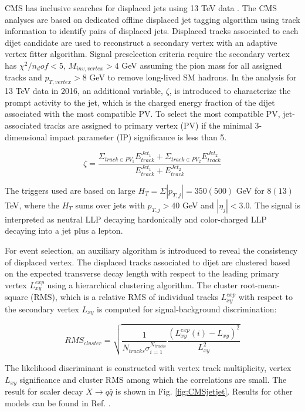 CMS has inclusive searches for displaced jets using 13 TeV data \cite{Sirunyan:2018vlw,Sirunyan:2018pwn}. The CMS analyses are based on dedicated offline displaced jet tagging algorithm using track information to identify pairs of displaced jets. Displaced tracks associated to each dijet candidate are used to reconstruct a secondary vertex with an adaptive vertex fitter algorithm. Signal preselection criteria require the secondary vertex has $\chi^2/n_dof < 5$, $M_{inv,vertex} > 4$ GeV assuming the pion mass for all assigned tracks and $p_{T,vertex} > 8$ GeV to remove long-lived SM hadrons. In the analysis for 13 TeV data in 2016, an additional variable, $\zeta$, is introduced to characterize the prompt activity to the jet, which is the charged energy fraction of the dijet associated with the most compatible PV. To select the most compatible PV, jet-associated tracks are assigned to primary vertex (PV) if the minimal 3-dimensional impact parameter (IP) significance is less than 5. 

\begin{equation}
\zeta = \frac{\Sigma_{track\in PV_1}E^{Jet_1}_{track}+\Sigma_{track\in PV_2}E^{Jet_2}_{track}}{E^{Jet_1}_{track}+E^{Jet_2}_{track}}
\end{equation}

The triggers used are based on large $H_T = \Sigma |p_{T,j}| = 350 (500)$ GeV for $8 (13)$ TeV, where the $H_T$ sums over jets with $p_{T,j} > 40$ GeV and $|\eta_j| <  3.0$. The signal is interpreted as neutral LLP decaying hardonically and color-charged LLP decaying into a jet plus a lepton. 

For event selection, an auxiliary algorithm is introduced to reveal the consistency of displaced vertex. The displaced tracks associated to dijet are clustered based on the expected transverse decay length with respect to the leading primary vertex $L_{xy}^{exp}$ using a hierarchical clustering algorithm. The cluster root-mean-square (RMS), which is a relative RMS of individual tracks $L_{xy}^{exp}$ with respect to the secondary vertex $L_{xy} $ is computed for signal-background discrimination:

\begin{equation}
    RMS_{cluster} = \sqrt{\frac{1}{N_{tracks}\sigma^{N_{tracks}}_{i=1}}\frac{(L_{xy}^{exp}(i)-L_{xy})^2}{L^2_{xy}}}
\end{equation}

The likelihood discriminant is constructed with vertex track multiplicity, vertex $L_{xy}$ significance and cluster RMS among which the correlations are small. The result for scaler decay $X \rightarrow q\bar{q}$ is shown in Fig. \ref{fig:CMSjetjet}. Results for other models can be found in Ref. \cite{Sirunyan:2018vlw}.

